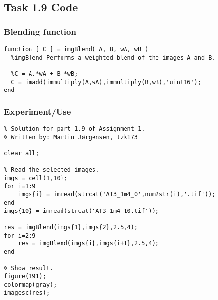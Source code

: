 \subsection{Task 1.9 Code}
\subsubsection{Blending function}
\begin{verbatim}
function [ C ] = imgBlend( A, B, wA, wB )
  %imgBlend Performs a weighted blend of the images A and B.

  %C = A.*wA + B.*wB;
  C = imadd(immultiply(A,wA),immultiply(B,wB),'uint16');
end
\end{verbatim}

\subsubsection{Experiment/Use}
\begin{verbatim}
% Solution for part 1.9 of Assignment 1.
% Written by: Martin Jørgensen, tzk173

clear all;

% Read the selected images.
imgs = cell(1,10);
for i=1:9
    imgs{i} = imread(strcat('AT3_1m4_0',num2str(i),'.tif'));
end
imgs{10} = imread(strcat('AT3_1m4_10.tif'));

res = imgBlend(imgs{1},imgs{2},2.5,4);
for i=2:9
    res = imgBlend(imgs{i},imgs{i+1},2.5,4);
end

% Show result.
figure(191);
colormap(gray);
imagesc(res);
\end{verbatim}
